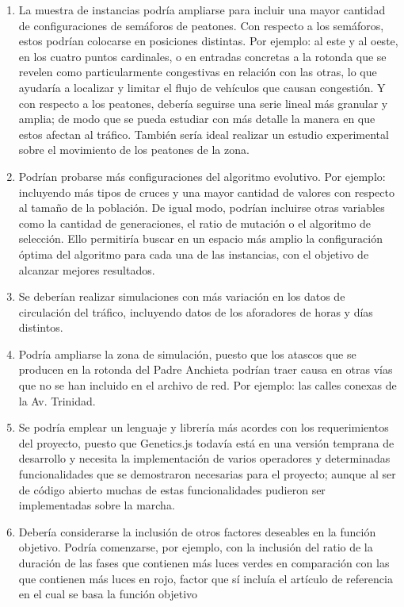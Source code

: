 \begin{enumerate}
    \item La muestra de instancias podría ampliarse para incluir una mayor cantidad de configuraciones de semáforos de peatones. Con respecto a los semáforos, estos podrían colocarse en posiciones distintas. Por ejemplo: al este y al oeste, en los cuatro puntos cardinales, o en entradas concretas a la rotonda que se revelen como particularmente congestivas en relación con las otras, lo que ayudaría a localizar y limitar el flujo de vehículos que causan congestión. Y con respecto a los peatones, debería seguirse una serie lineal más granular y amplia; de modo que se pueda estudiar con más detalle la manera en que estos afectan al tráfico. También sería ideal realizar un estudio experimental sobre el movimiento de los peatones de la zona.

    \item Podrían probarse más configuraciones del algoritmo evolutivo. Por ejemplo: incluyendo más tipos de cruces y una mayor cantidad de valores con respecto al tamaño de la población. De igual modo, podrían incluirse otras variables como la cantidad de generaciones, el ratio de mutación o el algoritmo de selección. Ello permitiría buscar en un espacio más amplio la configuración óptima del algoritmo para cada una de las instancias, con el objetivo de alcanzar mejores resultados.
    
    \item Se deberían realizar simulaciones con más variación en los datos de circulación del tráfico, incluyendo datos de los aforadores de horas y días distintos.
    
    \item Podría ampliarse la zona de simulación, puesto que los atascos que se producen en la rotonda del Padre Anchieta podrían traer causa en otras vías que no se han incluido en el archivo de red. Por ejemplo: las calles conexas de la Av. Trinidad.
    
    \item Se podría emplear un lenguaje y librería más acordes con los requerimientos del proyecto, puesto que Genetics.js todavía está en una versión temprana de desarrollo y necesita la implementación de varios operadores y determinadas funcionalidades que se demostraron necesarias para el proyecto; aunque al ser de código abierto muchas de estas funcionalidades pudieron ser implementadas sobre la marcha.
    
    \item Debería considerarse la inclusión de otros factores deseables en la función objetivo. Podría comenzarse, por ejemplo, con la inclusión del ratio de la duración de las fases que contienen más luces verdes en comparación con las que contienen más luces en rojo, factor que sí incluía el artículo de referencia en el cual se basa la función objetivo
    

\end{enumerate}

